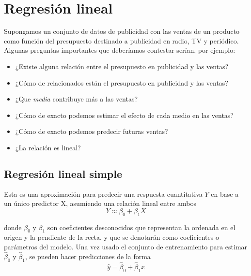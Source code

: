 \chapter{Regresión lineal}\label{Chapter2} 

\begin{example}
Supongamos un conjunto de datos de publicidad con las ventas de un producto como función del presupuesto destinado a publicidad en radio, TV y periódico. Algunas preguntas importantes que deberíamos contestar serían, por ejemplo: 
\begin{multicols}{2}
\begin{itemize}
\item ¿Existe alguna relación entre el presupuesto en publicidad y las ventas? 
\item ¿Cómo de relacionados están el presupuesto en publicidad y las ventas?
\item ¿Que \textit{media} contribuye más a las ventas?
\item ¿Cómo de exacto podemos estimar el efecto de cada medio en las ventas?
\item ¿Cómo de exacto podemos predecir futuras ventas?
\item ¿La relación es lineal?
\end{itemize}
\end{multicols}
\end{example}



\section{Regresión lineal simple}

Esta es una aproximación para predecir una respuesta cuantitativa $Y$ en base a un único predictor X, asumiendo una relación lineal entre ambos
\begin{equation}
Y \approx \beta_0 + \beta_1 X
\end{equation} 

\noindent donde $\beta_0$ y $\beta_1$ son coeficientes desconocidos que representan la ordenada en el origen y la pendiente de la recta, y que se denotarán como coeficientes o parámetros del modelo. Una vez usado el conjunto de entrenamiento para estimar $\hat{\beta}_0$ y $\hat{\beta}_1$, se pueden hacer predicciones de la forma 
\begin{equation}
\hat{y} = \hat{\beta}_0 + \hat{\beta}_1 x
\label{eq:3.2}
\end{equation} 

